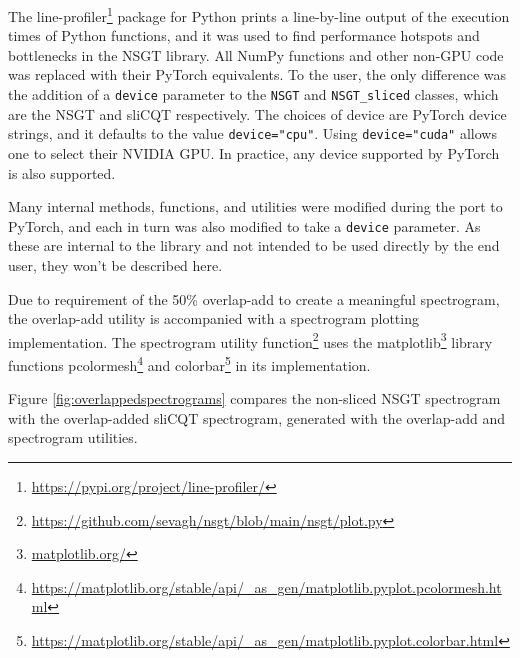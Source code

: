 \documentclass[report.tex]{subfiles}
\begin{document}
The line-profiler\footnote{\url{https://pypi.org/project/line-profiler/}} package for Python prints a line-by-line output of the execution times of Python functions, and it was used to find performance hotspots and bottlenecks in the NSGT library. All NumPy functions and other non-GPU code was replaced with their PyTorch equivalents. To the user, the only difference was the addition of a \Verb#device# parameter to the \Verb#NSGT# and \Verb#NSGT_sliced# classes, which are the NSGT and sliCQT respectively. The choices of device are PyTorch device strings, and it defaults to the value \Verb#device="cpu"#. Using \Verb#device="cuda"# allows one to select their NVIDIA GPU. In practice, any device supported by PyTorch is also supported.

Many internal methods, functions, and utilities were modified during the port to PyTorch, and each in turn was also modified to take a \Verb#device# parameter. As these are internal to the library and not intended to be used directly by the end user, they won't be described here.

Due to requirement of the 50\% overlap-add to create a meaningful spectrogram, the overlap-add utility is accompanied with a spectrogram plotting implementation.  The spectrogram utility function\footnote{\url{https://github.com/sevagh/nsgt/blob/main/nsgt/plot.py}} uses the matplotlib\footnote{\url{matplotlib.org/}} library functions pcolormesh\footnote{\url{https://matplotlib.org/stable/api/_as_gen/matplotlib.pyplot.pcolormesh.html}} and colorbar\footnote{\url{https://matplotlib.org/stable/api/_as_gen/matplotlib.pyplot.colorbar.html}} in its implementation.

Figure \ref{fig:overlappedspectrograms} compares the non-sliced NSGT spectrogram with the overlap-added sliCQT spectrogram, generated with the overlap-add and spectrogram utilities.
\end{document}
